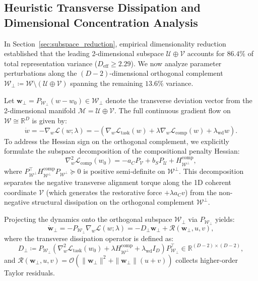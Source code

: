 \documentclass{article}
\theoremstyle{plain}
\theoremstyle{definition}
\begin{document}
\subsection{Heuristic Transverse Dissipation and Dimensional Concentration Analysis}
\label{sec:app_residual_perturbation}
In Section~\ref{sec:subspace_reduction}, empirical dimensionality reduction established that the leading 2-dimensional subspace $\mathcal{U} \oplus \mathcal{V}$ accounts for $86.4\%$ of total representation variance ($D_{\text{eff}} \ge 2.29$). We now analyze parameter perturbations along the $(D-2)$-dimensional orthogonal complement $\mathcal{W}_\perp \coloneqq \mathcal{W} \setminus (\mathcal{U} \oplus \mathcal{V})$ spanning the remaining $13.6\%$ variance.

Let $\mathbf{w}_\perp = P_{\mathcal{W}_\perp} (w - w_0) \in \mathcal{W}_\perp$ denote the transverse deviation vector from the 2-dimensional manifold $\mathcal{M} = \mathcal{U} \oplus \mathcal{V}$. The full continuous gradient flow on $\mathcal{W} \cong \mathbb{R}^D$ is given by:
\begin{equation}
    \dot{w} = -\nabla_w \mathcal{L}(w; \lambda) = -\left( \nabla_w \mathcal{L}_{\text{task}}(w) + \lambda \nabla_w \mathcal{L}_{\text{comp}}(w) + \lambda_{\text{wd}} w \right).
\end{equation}
To address the Hessian sign on the orthogonal complement, we explicitly formulate the subspace decomposition of the compositional penalty Hessian:
\begin{equation}
    \nabla_w^2 \mathcal{L}_{\text{comp}}(w_0) = -a_C P_{\mathcal{V}} + b_S P_{\mathcal{U}} + H_{\mathcal{W}^\perp}^{\text{comp}},
    \label{eq:comp_hessian_decomp}
\end{equation}
where $P_{\mathcal{W}^\perp}^\top H_{\mathcal{W}^\perp}^{\text{comp}} P_{\mathcal{W}^\perp} \succeq 0$ is positive semi-definite on $\mathcal{W}^\perp$. This decomposition separates the negative transverse alignment torque along the 1D coherent coordinate $\mathcal{V}$ (which generates the restorative force $+\lambda a_C v$) from the non-negative structural dissipation on the orthogonal complement $\mathcal{W}^\perp$.

Projecting the dynamics onto the orthogonal subspace $\mathcal{W}_\perp$ via $P_{\mathcal{W}_\perp}$ yields:
\begin{equation}
    \dot{\mathbf{w}}_\perp = -P_{\mathcal{W}_\perp} \nabla_w \mathcal{L}(w; \lambda) = -D_\perp \mathbf{w}_\perp + \mathcal{R}(\mathbf{w}_\perp, u, v),
    \label{eq:w_perp_dynamics}
\end{equation}
where the transverse dissipation operator is defined as:
\begin{equation}
    D_\perp \coloneqq P_{\mathcal{W}_\perp} \left( \nabla_w^2 \mathcal{L}_{\text{task}}(w_0) + \lambda H_{\mathcal{W}^\perp}^{\text{comp}} + \lambda_{\text{wd}} I_D \right) P_{\mathcal{W}_\perp}^\top \in \mathbb{R}^{(D-2) \times (D-2)},
\end{equation}
and $\mathcal{R}(\mathbf{w}_\perp, u, v) = \mathcal{O}(\|\mathbf{w}_\perp\|^2 + \|\mathbf{w}_\perp\| (u + v))$ collects higher-order Taylor residuals.
\end{document}
